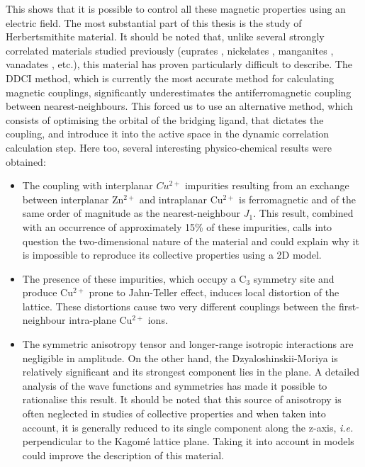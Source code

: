 \documentclass[12pt,a4paper]{report}
\numberwithin{equation}{section}
\begin{document}
This shows that it is possible to control all these magnetic properties using an electric field.  
The most substantial part of this thesis is the study of Herbertsmithite material. 
It should be noted that, unlike several strongly correlated materials studied previously (cuprates \cite{calzado_proposal_2001}, nickelates \cite{bastardis_microscopic_2007-1}, manganites \cite{bastardis_ab_2008}, vanadates \cite{suaud_ab_2000}, etc.), this material has proven particularly difficult to describe.
The DDCI method, which is currently the most accurate method for calculating magnetic couplings, significantly underestimates the antiferromagnetic coupling between nearest-neighbours.
This forced us to use an alternative method, which consists of optimising the orbital of the bridging ligand, that dictates the coupling, and introduce it into the active space in the dynamic correlation calculation step.
Here too, several interesting physico-chemical results were obtained:
\begin{itemize}
    \item[-]The coupling with interplanar $Cu^{2+}$ impurities resulting from an exchange between interplanar Zn$^{2+}$ and intraplanar Cu$^{2+}$ is ferromagnetic and of the same order of magnitude as the nearest-neighbour $J_1$. 
    This result, combined with an occurrence of approximately 15\% of these impurities, calls into question the two-dimensional nature of the material and could explain why it is impossible to reproduce its collective properties using a 2D model.
    \item[-]The presence of these impurities, which occupy a C$_3$ symmetry site and produce Cu$^{2+}$ prone to Jahn-Teller effect, induces local distortion of the lattice.
    These distortions cause two very different couplings between the first-neighbour intra-plane Cu$^{2+}$ ions.
    \item[-]The symmetric anisotropy tensor and longer-range isotropic interactions are negligible in amplitude.
    On the other hand, the Dzyaloshinskii-Moriya is relatively significant and its strongest component lies in the plane.
    A detailed analysis of the wave functions and symmetries has made it possible to rationalise this result.
    It should be noted that this source of anisotropy is often neglected in studies of collective properties and when taken into account, it is generally reduced to its single component along the z-axis, \textit{i.e.} perpendicular to the Kagomé lattice plane.
    Taking it into account in models could improve the description of this material. 
\end{itemize}
\end{document}

